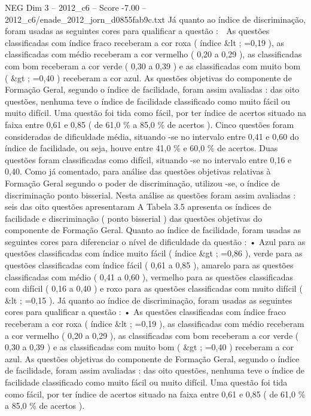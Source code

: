 \begin{textsample}{NEG Dim 3 – 2012\_c6 – Score -7.00 – 2012\_c6/enade\_2012\_jorn\_d0855fab9c.txt}
Já quanto ao índice de discriminação, foram usadas as seguintes cores para qualificar a questão :  As questões classificadas com índice fraco receberam a cor roxa ( índice \&lt ; =0,19 ), as classificadas com médio receberam a cor vermelho ( 0,20 a 0,29 ), as classificadas com bom receberam a cor verde ( 0,30 a 0,39 ) e as classificadas com muito bom ( \&gt ; =0,40 ) receberam a cor azul.
As questões objetivas do componente de Formação Geral, segundo o índice de facilidade, foram assim avaliadas : das oito questões, nenhuma teve o índice de facilidade classificado como muito fácil ou muito difícil.
Uma questão foi tida como fácil, por ter índice de acertos situado na faixa entre 0,61 e 0,85 ( de 61,0 \% a 85,0 \% de acertos ).
Cinco questões foram consideradas de dificuldade média, situando -se no intervalo entre 0,41 e 0,60 do índice de facilidade, ou seja, houve entre 41,0 \% e 60,0 \% de acertos.
Duas questões foram classificadas como difícil, situando -se no intervalo entre 0,16 e 0,40.
Como já comentado, para análise das questões objetivas relativas à Formação Geral segundo o poder de discriminação, utilizou -se, o índice de discriminação ponto bisserial.
Nesta análise as questões foram assim avaliadas : seis das oito questões apresentaram A Tabela 3.5 apresenta os índices de facilidade e discriminação ( ponto bisserial ) das questões objetivas do componente de Formação Geral.
Quanto ao índice de facilidade, foram usadas as seguintes cores para diferenciar o nível de dificuldade da questão : • Azul para as questões classificadas com índice muito fácil ( índice \&gt ; =0,86 ), verde para as questões classificadas com índice fácil ( 0,61 a 0,85 ), amarelo para as questões classificadas com médio ( 0,41 a 0,60 ), vermelho para as questões classificadas com difícil ( 0,16 a 0,40 ) e roxo para as questões classificadas com muito difícil ( \&lt ; =0,15 ).
Já quanto ao índice de discriminação, foram usadas as seguintes cores para qualificar a questão : • As questões classificadas com índice fraco receberam a cor roxa ( índice \&lt ; =0,19 ), as classificadas com médio receberam a cor vermelho ( 0,20 a 0,29 ), as classificadas com bom receberam a cor verde ( 0,30 a 0,39 ) e as classificadas com muito bom ( \&gt ; =0,40 ) receberam a cor azul.
As questões objetivas do componente de Formação Geral, segundo o índice de facilidade, foram assim avaliadas : das oito questões, nenhuma teve o índice de facilidade classificado como muito fácil ou muito difícil.
Uma questão foi tida como fácil, por ter índice de acertos situado na faixa entre 0,61 e 0,85 ( de 61,0 \% a 85,0 \% de acertos ).

\end{textsample}
